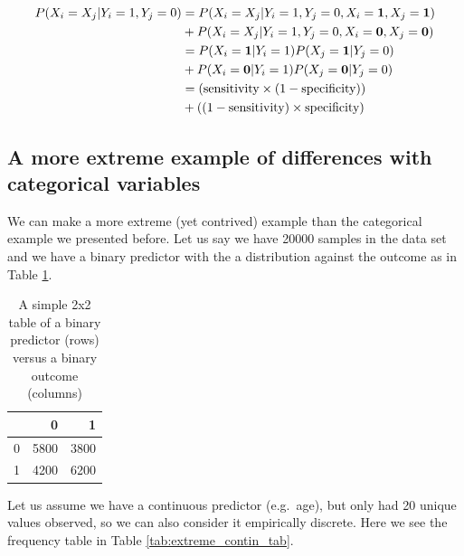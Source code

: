 \documentclass[article]{jss}
\begin{document}
\begin{align*}
P(X_{i} = X_{j} | Y_{i} = 1, Y_{j} = 0) &= P(X_{i} = X_{j} | Y_{i} = 1, Y_{j} = 0, X_{i} = {\bf 1}, X_{j} = {\bf 1}) \\
&+ P(X_{i} = X_{j} | Y_{i} = 1, Y_{j} = 0, X_{i} = {\bf 0}, X_{j} = {\bf 0}) \\
&= P(X_{i} = {\bf 1} | Y_{i} = 1) P(X_{j} = {\bf 1} | Y_{j} = 0) \\
&+ P(X_{i} = {\bf 0} | Y_{i} = 1) P(X_{j} = {\bf 0} | Y_{j} = 0) \\
&= \left(\text{sensitivity} \times (1 - \text{specificity})\right) \\
&+ \left((1- \text{sensitivity}) \times \text{specificity}\right)
\end{align*}

\hypertarget{a-more-extreme-example-of-differences-with-categorical-variables}{%
\subsection{A more extreme example of differences with categorical
variables}\label{a-more-extreme-example-of-differences-with-categorical-variables}}

We can make a more extreme (yet contrived) example than the categorical
example we presented before. Let us say we have 20000 samples in the
data set and we have a binary predictor with the a distribution against
the outcome as in Table \ref{tab:extreme_bin_tab}.

\begin{CodeChunk}
\begin{table}[ht]

\caption{\label{tab:extreme_bin_tab}A simple 2x2 table of a binary predictor (rows) versus a binary outcome (columns)}
\centering
\begin{tabular}{l|r|r}
\hline
  & 0 & 1\\
\hline
0 & 5800 & 3800\\
\hline
1 & 4200 & 6200\\
\hline
\end{tabular}
\end{table}

\end{CodeChunk}

Let us assume we have a continuous predictor (e.g.~age), but only had 20
unique values observed, so we can also consider it empirically discrete.
Here we see the frequency table in Table \ref{tab:extreme_contin_tab}.
\end{document}
